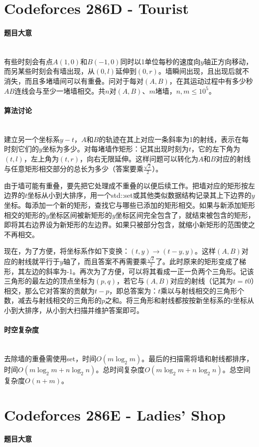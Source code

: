 \documentclass[UTF8]{ctexart}
\newcommand{\myparagraph}[1]{\paragraph{#1}\mbox{}\\}
\theoremstyle{nonumberplain}
\begin{document}
	\section{Codeforces 286D - Tourist}
	
		\myparagraph{题目大意}
		
			有些时刻会有点$A(1,0)$和$B(-1,0)$同时以1单位每秒的速度向$y$轴正方向移动，而另某些时刻会有墙出现，从$(0,l)$延伸到$(0,r)$。墙瞬间出现，且出现后就不消失，而且多堵墙间可以有重叠。问对于每对$(A,B)$，在其运动过程中有多少秒$AB$连线会与至少一堵墙相交。共$n$对$(A,B)$、$m$堵墙，$n,m \leq 10^5$。
		
		\myparagraph{算法讨论}
		
			建立另一个坐标系$y-t$，$A$和$B$的轨迹在其上对应一条斜率为1的射线，表示在每时刻它们的$y$坐标为多少。对每堵墙作矩形：记其出现时刻为$t$，它的左下角为$(t,l)$，左上角为$(t,r)$，向右无限延伸。这样问题可以转化为$A$和$B$对应的射线与任意矩形相交部分的总长为多少（答案要乘$\frac{\sqrt{2}}{2}$）。
			
			由于墙可能有重叠，要先把它处理成不重叠的以便后续工作。把墙对应的矩形按左边界的$t$坐标从小到大排序，用一个std::set或其他类似数据结构记录其上下边界的$y$坐标。每添加一个新的矩形，查找它与哪些已添加的矩形相交。如果与新添加矩形相交的矩形的$y$坐标区间被新矩形的$y$坐标区间完全包含了，就结束被包含的矩形，即将其右边界设为新矩形的左边界。如果只被部分包含，就缩小新矩形的范围使之不再相交。
			
			现在，为了方便，将坐标系作如下变换：$(t,y) \to (t-y,y)$。这样$(A,B)$对应的射线就平行于$y$轴了，而且答案不再需要乘$\frac{\sqrt{2}}{2}$了。此时原来的矩形变成了梯形，其左边的斜率为-1。再次为了方便，可以将其看成一正一负两个三角形。记该三角形的最左边的顶点坐标为$(p,q)$，若它与$(A,B)$对应的射线（记其为$t=t0$）相交，那么它对答案的贡献为$t-p$，即总答案为：$t$乘以与射线相交的三角形个数，减去与射线相交的三角形的$p$之和。将三角形和射线都按按新坐标系的$t$坐标从小到大排序，从小到大扫描并维护答案即可。
		
		\myparagraph{时空复杂度}
		
			去除墙的重叠需使用set，时间$O(m\log_2m)$。最后的扫描需将墙和射线都排序，时间$O(m\log_2m + n\log_2n)$。总时间复杂度$O(m\log_2m + n\log_2n)$。总空间复杂度$O(n+m)$。
	
	\section{Codeforces 286E - Ladies' Shop}
	
		\myparagraph{题目大意}
		
\end{document}

